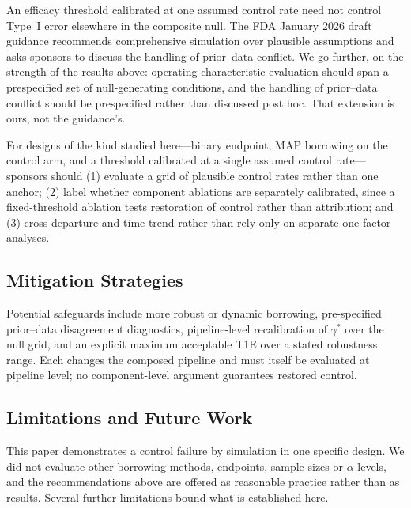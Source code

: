 \documentclass[11pt]{article}
\begin{document}
An efficacy threshold calibrated at one assumed control rate need not control
Type~I error elsewhere in the composite null.  The FDA January 2026 draft
guidance recommends comprehensive simulation over plausible assumptions and
asks sponsors to discuss the handling of prior--data conflict.  We go further,
on the strength of the results above: operating-characteristic evaluation
should span a prespecified set of null-generating conditions, and the handling
of prior--data conflict should be prespecified rather than discussed post hoc.
That extension is ours, not the guidance's.

For designs of the kind studied here---binary endpoint, MAP borrowing on the
control arm, and a threshold calibrated at a single assumed control
rate---sponsors should (1) evaluate a grid of plausible control
rates rather than one anchor; (2) label whether component ablations are
separately calibrated, since a fixed-threshold ablation tests restoration of
control rather than attribution; and (3) cross departure and time trend rather
than rely only on separate one-factor analyses.

\subsection{Mitigation Strategies}
\label{sec:mitigation}

Potential safeguards include more robust or dynamic borrowing, pre-specified
prior--data disagreement diagnostics, pipeline-level recalibration of
$\gamma^*$ over the null grid, and an explicit maximum acceptable T1E over a
stated robustness range.  Each changes the composed pipeline and must itself be
evaluated at pipeline level; no component-level argument guarantees restored
control.

\subsection{Limitations and Future Work}

This paper demonstrates a control failure by simulation in one specific
design.  We did not evaluate other borrowing methods, endpoints, sample sizes
or $\alpha$ levels, and the recommendations above are offered as reasonable
practice rather than as results.  Several further limitations bound what is
established here.
\end{document}
